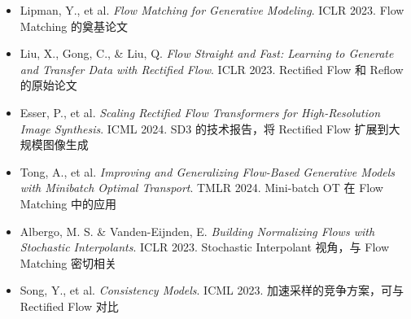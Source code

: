 \begin{itemize}
    \item Lipman, Y., et al. \textit{Flow Matching for Generative Modeling}. ICLR 2023. {\small Flow Matching 的奠基论文}
    \item Liu, X., Gong, C., \& Liu, Q. \textit{Flow Straight and Fast: Learning to Generate and Transfer Data with Rectified Flow}. ICLR 2023. {\small Rectified Flow 和 Reflow 的原始论文}
    \item Esser, P., et al. \textit{Scaling Rectified Flow Transformers for High-Resolution Image Synthesis}. ICML 2024. {\small SD3 的技术报告，将 Rectified Flow 扩展到大规模图像生成}
    \item Tong, A., et al. \textit{Improving and Generalizing Flow-Based Generative Models with Minibatch Optimal Transport}. TMLR 2024. {\small Mini-batch OT 在 Flow Matching 中的应用}
    \item Albergo, M. S. \& Vanden-Eijnden, E. \textit{Building Normalizing Flows with Stochastic Interpolants}. ICLR 2023. {\small Stochastic Interpolant 视角，与 Flow Matching 密切相关}
    \item Song, Y., et al. \textit{Consistency Models}. ICML 2023. {\small 加速采样的竞争方案，可与 Rectified Flow 对比}
\end{itemize}



